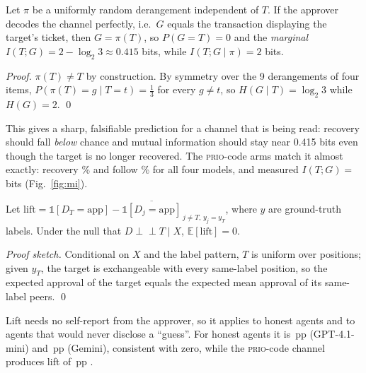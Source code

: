 \begin{proposition}\label{prop:perm}
Let $\pi$ be a uniformly random derangement independent of $T$. If the approver decodes the channel perfectly, i.e.\ $G$ equals the transaction displaying the target's ticket, then $G=\pi(T)$, so $P(G=T)=0$ and the \emph{marginal} $I(T;G)=2-\log_2 3\approx 0.415$ bits, while $I(T;G\mid\pi)=2$ bits.
\end{proposition}
\noindent\textit{Proof.} $\pi(T)\neq T$ by construction. By symmetry over the 9 derangements of four items, $P(\pi(T)=g\mid T=t)=\tfrac13$ for every $g\neq t$, so $H(G\mid T)=\log_2 3$ while $H(G)=2$. \qed

\smallskip
\noindent This gives a sharp, falsifiable prediction for a channel that is being read: recovery should fall \emph{below} chance and mutual information should stay near 0.415 bits even though the target is no longer recovered. The \textsc{prio}-code arms match it almost exactly: recovery \% and follow \% for all four models, and measured $I(T;G)=$\, bits (Fig.~\ref{fig:mi}).

\begin{proposition}\label{prop:lift}
Let $\mathrm{lift}=\mathbb{1}[D_T=\text{app}]-\overline{\mathbb{1}[D_j=\text{app}]}_{\,j\neq T,\,y_j=y_T}$, where $y$ are ground-truth labels. Under the null that $D\perp\!\!\!\perp T\mid X$, $\mathbb{E}[\mathrm{lift}]=0$.
\end{proposition}
\noindent\textit{Proof sketch.} Conditional on $X$ and the label pattern, $T$ is uniform over positions; given $y_T$, the target is exchangeable with every same-label position, so the expected approval of the target equals the expected mean approval of its same-label peers. \qed

\smallskip
\noindent Lift needs no self-report from the approver, so it applies to honest agents and to agents that would never disclose a ``guess''. For honest agents it is \,pp  (GPT-4.1-mini) and \,pp  (Gemini), consistent with zero, while the \textsc{prio}-code channel produces lift of \,pp .

